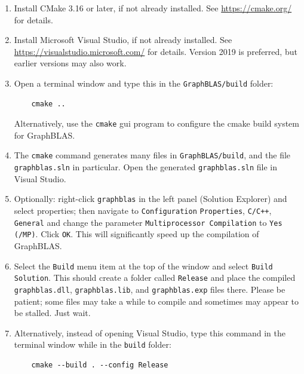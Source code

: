 \begin{enumerate}

\item Install CMake 3.16 or later, if not already installed.
    See \url{https://cmake.org/} for details.

\item Install Microsoft Visual Studio, if not already installed.
    See \url{https://visualstudio.microsoft.com/} for details.
    Version 2019 is preferred, but earlier versions may also work.

\item Open a terminal window and type this in the
    \verb'GraphBLAS/build' folder:

    \vspace{-0.1in}
    {\small
    \begin{verbatim}
    cmake ..  \end{verbatim} }
    \vspace{-0.1in}

    Alternatively, use the \verb'cmake' gui program to configure
    the cmake build system for GraphBLAS.

\item The \verb'cmake' command generates many files in
    \verb'GraphBLAS/build', and the file \verb'graphblas.sln' in
    particular.  Open the generated \verb'graphblas.sln' file in Visual Studio.

\item Optionally: right-click \verb'graphblas' in the left panel (Solution
    Explorer) and select properties; then navigate to \verb'Configuration'
    \verb'Properties', \verb'C/C++', \verb'General' and change the parameter
    \verb'Multiprocessor Compilation' to \verb'Yes (/MP)'.  Click \verb'OK'.
    This will significantly speed up the compilation of GraphBLAS.

\item Select the \verb'Build' menu item at the top of the window and
    select \verb'Build Solution'.  This should create a folder called
    \verb'Release' and place the compiled \verb'graphblas.dll',
    \verb'graphblas.lib', and \verb'graphblas.exp' files there.  Please be
    patient; some files may take a while to compile and sometimes may appear to
    be stalled.  Just wait.

\item Alternatively, instead of opening Visual Studio,
    type this command in the terminal window while in the \verb'build' folder:
    {\small
    \begin{verbatim}
    cmake --build . --config Release
    \end{verbatim}}


\end{enumerate}

